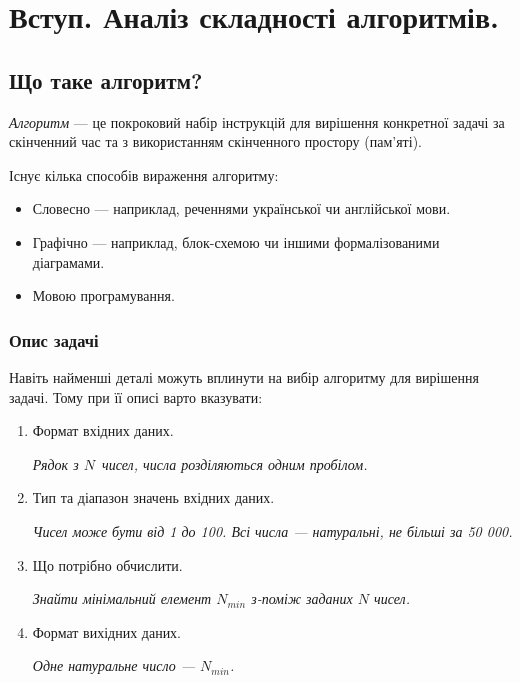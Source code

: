 \documentclass[12pt,a4paper]{report}
\begin{document}
\chapter{Вступ. Аналіз складності алгоритмів.}



\section{Що таке алгоритм?}
\emph{Алгоритм} --- це покроковий набір інструкцій для вирішення конкретної задачі за скінченний час та з використанням скінченного простору (пам’яті).

\vspace{0.5em}
Існує кілька способів вираження алгоритму:
\begin{itemize}
    \item Словесно --- наприклад, реченнями української чи англійської мови.
    \item Графічно --- наприклад, блок-схемою чи іншими формалізованими діаграмами.
    \item Мовою програмування.
\end{itemize}


\subsection*{Опис задачі}
Навіть найменші деталі можуть вплинути на вибір алгоритму для вирішення задачі.
Тому при її описі варто вказувати:
\begin{enumerate}
    \item Формат вхідних даних.

        {\itshape Рядок з \(N\)\ чисел, числа розділяються одним пробілом.}

    \item Тип та діапазон значень вхідних даних.

        {\itshape Чисел може бути від 1 до 100. Всі числа --- натуральні, не більші за 50 000.}

    \item Що потрібно обчислити.

        {\itshape Знайти мінімальний елемент \(N_{min}\) з-поміж заданих \(N\) чисел.}

    \item Формат вихідних даних.

        {\itshape Одне натуральне число --- \(N_{min}\).}

\end{enumerate}
\end{document}

